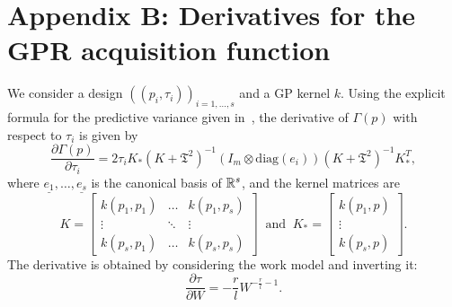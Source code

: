 \section{Appendix B: Derivatives for the GPR acquisition function}\label{app:derivatives} 
We consider a design $\left( (p_i,\tau_i)\right)_{i=1,\dots,s}$ and a GP kernel $k$. Using the explicit formula for the predictive variance given in~\cite[equation 2.24]{RasmussenWilliams2006}, the derivative of $\Gamma(p)$ with respect to $\tau_i$ is given by \[
    \frac{\partial \Gamma(p)}{\partial \tau_i} = 2\tau_i K_* (K + \mathfrak{T} ^2  )^{-1} (I_m \otimes \text{diag}(e_i))(K + \mathfrak{T} ^2  )^{-1} K_*^T,
\] 
where $\underline{e_1}, \dots,\underline{e_s}$ is the canonical basis of $\mathbb{R}^s$, and the kernel matrices are\[
K = \begin{bmatrix} k(p_1,p_1) & \dots & k(p_1,p_s) \\
    \vdots               & \ddots & \vdots \\
    k(p_s,p_1) & \dots & k(p_s,p_s)
\end{bmatrix} \ \text{ and } \
K_* =  \begin{bmatrix}
    k(p_1,p) \\
    \vdots \\
    k(p_s,p)
\end{bmatrix}.
\]
The derivative is obtained by considering the work model and inverting it:
\[
\frac{\partial \tau}{\partial W} = -\frac{r}{l} W^{-\frac{r}{l}-1}.
\]
